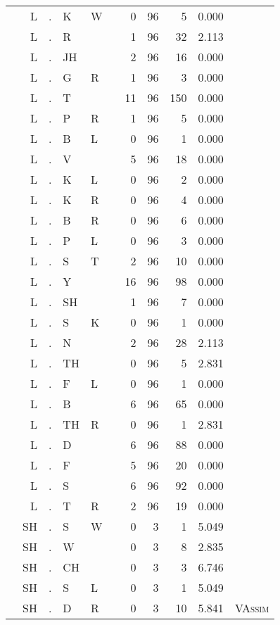 \begin{longtable}{r@{ } r@{ } c@{ } l@{ } l@{ } l@{ } r r r r l }
 & L & . & K & W &  & 0 & 96 & 5 & 0.000 &  \\
 & L & . & R &  &  & 1 & 96 & 32 & 2.113 &  \\
 & L & . & JH &  &  & 2 & 96 & 16 & 0.000 &  \\
 & L & . & G & R &  & 1 & 96 & 3 & 0.000 &  \\
 & L & . & T &  &  & 11 & 96 & 150 & 0.000 &  \\
 & L & . & P & R &  & 1 & 96 & 5 & 0.000 &  \\
 & L & . & B & L &  & 0 & 96 & 1 & 0.000 &  \\
 & L & . & V &  &  & 5 & 96 & 18 & 0.000 &  \\
 & L & . & K & L &  & 0 & 96 & 2 & 0.000 &  \\
 & L & . & K & R &  & 0 & 96 & 4 & 0.000 &  \\
 & L & . & B & R &  & 0 & 96 & 6 & 0.000 &  \\
 & L & . & P & L &  & 0 & 96 & 3 & 0.000 &  \\
 & L & . & S & T &  & 2 & 96 & 10 & 0.000 &  \\
 & L & . & Y &  &  & 16 & 96 & 98 & 0.000 &  \\
 & L & . & SH &  &  & 1 & 96 & 7 & 0.000 &  \\
 & L & . & S & K &  & 0 & 96 & 1 & 0.000 &  \\
 & L & . & N &  &  & 2 & 96 & 28 & 2.113 &  \\
 & L & . & TH &  &  & 0 & 96 & 5 & 2.831 &  \\
 & L & . & F & L &  & 0 & 96 & 1 & 0.000 &  \\
 & L & . & B &  &  & 6 & 96 & 65 & 0.000 &  \\
 & L & . & TH & R &  & 0 & 96 & 1 & 2.831 &  \\
 & L & . & D &  &  & 6 & 96 & 88 & 0.000 &  \\
 & L & . & F &  &  & 5 & 96 & 20 & 0.000 &  \\
 & L & . & S &  &  & 6 & 96 & 92 & 0.000 &  \\
 & L & . & T & R &  & 2 & 96 & 19 & 0.000 &  \\
 & SH & . & S & W &  & 0 & 3 & 1 & 5.049 &  \\
 & SH & . & W &  &  & 0 & 3 & 8 & 2.835 &  \\
 & SH & . & CH &  &  & 0 & 3 & 3 & 6.746 &  \\
 & SH & . & S & L &  & 0 & 3 & 1 & 5.049 &  \\
 & SH & . & D & R &  & 0 & 3 & 10 & 5.841 & \textsc{VAssim} \\

\end{longtable}
